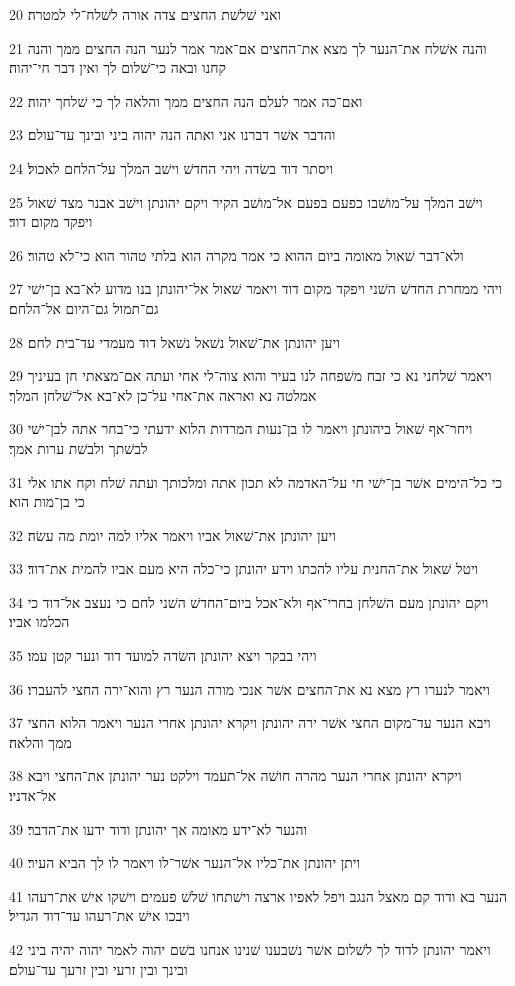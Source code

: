 \par 20 ואני שׁלשׁת החצים צדה אורה לשׁלח־לי למטרה׃
\par 21 והנה אשׁלח את־הנער לך מצא את־החצים אם־אמר אמר לנער הנה החצים ממך והנה קחנו ובאה כי־שׁלום לך ואין דבר חי־יהוה׃
\par 22 ואם־כה אמר לעלם הנה החצים ממך והלאה לך כי שׁלחך יהוה׃
\par 23 והדבר אשׁר דברנו אני ואתה הנה יהוה ביני ובינך עד־עולם׃
\par 24 ויסתר דוד בשׂדה ויהי החדשׁ וישׁב המלך על־הלחם לאכול׃
\par 25 וישׁב המלך על־מושׁבו כפעם בפעם אל־מושׁב הקיר ויקם יהונתן וישׁב אבנר מצד שׁאול ויפקד מקום דוד׃
\par 26 ולא־דבר שׁאול מאומה ביום ההוא כי אמר מקרה הוא בלתי טהור הוא כי־לא טהור׃
\par 27 ויהי ממחרת החדשׁ השׁני ויפקד מקום דוד ויאמר שׁאול אל־יהונתן בנו מדוע לא־בא בן־ישׁי גם־תמול גם־היום אל־הלחם׃
\par 28 ויען יהונתן את־שׁאול נשׁאל נשׁאל דוד מעמדי עד־בית לחם׃
\par 29 ויאמר שׁלחני נא כי זבח משׁפחה לנו בעיר והוא צוה־לי אחי ועתה אם־מצאתי חן בעיניך אמלטה נא ואראה את־אחי על־כן לא־בא אל־שׁלחן המלך׃
\par 30 ויחר־אף שׁאול ביהונתן ויאמר לו בן־נעות המרדות הלוא ידעתי כי־בחר אתה לבן־ישׁי לבשׁתך ולבשׁת ערות אמך׃
\par 31 כי כל־הימים אשׁר בן־ישׁי חי על־האדמה לא תכון אתה ומלכותך ועתה שׁלח וקח אתו אלי כי בן־מות הוא׃
\par 32 ויען יהונתן את־שׁאול אביו ויאמר אליו למה יומת מה עשׂה׃
\par 33 ויטל שׁאול את־החנית עליו להכתו וידע יהונתן כי־כלה היא מעם אביו להמית את־דוד׃
\par 34 ויקם יהונתן מעם השׁלחן בחרי־אף ולא־אכל ביום־החדשׁ השׁני לחם כי נעצב אל־דוד כי הכלמו אביו׃
\par 35 ויהי בבקר ויצא יהונתן השׂדה למועד דוד ונער קטן עמו׃
\par 36 ויאמר לנערו רץ מצא נא את־החצים אשׁר אנכי מורה הנער רץ והוא־ירה החצי להעברו׃
\par 37 ויבא הנער עד־מקום החצי אשׁר ירה יהונתן ויקרא יהונתן אחרי הנער ויאמר הלוא החצי ממך והלאה׃
\par 38 ויקרא יהונתן אחרי הנער מהרה חושׁה אל־תעמד וילקט נער יהונתן את־החצי ויבא אל־אדניו׃
\par 39 והנער לא־ידע מאומה אך יהונתן ודוד ידעו את־הדבר׃
\par 40 ויתן יהונתן את־כליו אל־הנער אשׁר־לו ויאמר לו לך הביא העיר׃
\par 41 הנער בא ודוד קם מאצל הנגב ויפל לאפיו ארצה וישׁתחו שׁלשׁ פעמים וישׁקו אישׁ את־רעהו ויבכו אישׁ את־רעהו עד־דוד הגדיל׃
\par 42 ויאמר יהונתן לדוד לך לשׁלום אשׁר נשׁבענו שׁנינו אנחנו בשׁם יהוה לאמר יהוה יהיה ביני ובינך ובין זרעי ובין זרעך עד־עולם׃

